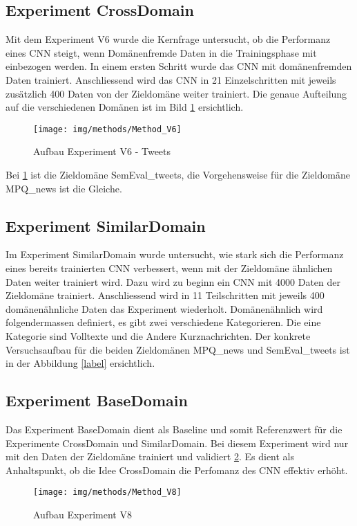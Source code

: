 \subsection{Experiment CrossDomain}
Mit dem Experiment V6 wurde die Kernfrage untersucht, ob die Performanz eines CNN steigt, wenn Domänenfremde Daten in die Trainingsphase mit einbezogen werden.
In einem ersten Schritt wurde das CNN mit domänenfremden Daten trainiert. Anschliessend wird das CNN in 21 Einzelschritten mit jeweils zusätzlich 400 Daten von der Zieldomäne weiter trainiert. Die genaue Aufteilung auf die verschiedenen Domänen ist im Bild \ref{fig:Method_V6} ersichtlich.
\begin{figure}[H]
	\centering
	\texttt{[image: img/methods/Method\_V6]}
	\caption{Aufbau Experiment V6 - Tweets}
	\label{fig:Method_V6}
\end{figure}
Bei \ref{fig:Method_V6} ist die Zieldomäne SemEval\_tweets, die Vorgehensweise für die Zieldomäne MPQ\_news ist die Gleiche.
\subsection{Experiment SimilarDomain}
Im Experiment SimilarDomain wurde untersucht, wie stark sich die Performanz eines bereits trainierten CNN verbessert, wenn mit der Zieldomäne ähnlichen Daten weiter trainiert wird. Dazu wird zu beginn ein CNN mit 4000 Daten der Zieldomäne trainiert. Anschliessend wird in 11 Teilschritten mit jeweils 400 domänenähnliche Daten das Experiment wiederholt.
Domänenähnlich wird folgendermassen definiert, es gibt zwei verschiedene Kategorieren. Die eine Kategorie sind Volltexte und die Andere Kurznachrichten.
Der konkrete Versuchsaufbau für die beiden Zieldomänen MPQ\_news und SemEval\_tweets ist in der Abbildung \ref{label} ersichtlich.

\subsection{Experiment BaseDomain}
\label{methods:v8}
Das Experiment BaseDomain dient als Baseline und somit Referenzwert für die Experimente CrossDomain und SimilarDomain.
Bei diesem Experiment wird nur mit den Daten der Zieldomäne trainiert und validiert \ref{fig:Method_V8}. Es dient als Anhaltspunkt, ob die Idee CrossDomain die Perfomanz des CNN effektiv erhöht.
\begin{figure}[H]
	\centering
	\texttt{[image: img/methods/Method\_V8]}
	\caption{Aufbau Experiment V8}
	\label{fig:Method_V8}
\end{figure}



